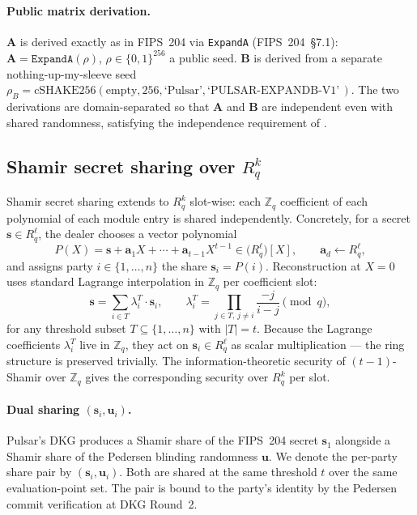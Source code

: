\documentclass[11pt,a4paper]{article}
\theoremstyle{definition}
\theoremstyle{remark}
\newcommand{\Rq}{R_q}
\newcommand{\Zq}{\mathbb{Z}_q}
\newcommand{\cSHAKE}{\mathrm{cSHAKE256}}
\begin{document}
\paragraph{Public matrix derivation.}
$\mathbf{A}$ is derived exactly as in FIPS~204 via
\texttt{ExpandA} (FIPS~204~\S7.1): \(\mathbf{A} = \texttt{ExpandA}(\rho)\),
$\rho \in \{0,1\}^{256}$ a public seed. $\mathbf{B}$ is derived from
a separate nothing-up-my-sleeve seed
$\rho_B = \cSHAKE(\text{empty}, 256, \text{`Pulsar'},
\text{`PULSAR-EXPANDB-V1'}\,)$. The two derivations are
domain-separated so that $\mathbf{A}$ and $\mathbf{B}$ are independent
even with shared randomness, satisfying the independence
requirement of .

\subsection{Shamir secret sharing over $\Rq^k$}
\label{sec:prelim-shamir}

Shamir secret sharing extends to $\Rq^k$ slot-wise: each $\Zq$
coefficient of each polynomial of each module entry is shared
independently. Concretely, for a secret $\mathbf{s} \in \Rq^\ell$,
the dealer chooses a vector polynomial
\[
P(X) = \mathbf{s} + \mathbf{a}_1 X + \cdots + \mathbf{a}_{t-1} X^{t-1}
\in \bigl(\Rq^\ell\bigr)[X], \qquad \mathbf{a}_d \gets \Rq^\ell,
\]
and assigns party $i \in \{1, \dots, n\}$ the share $\mathbf{s}_i = P(i)$.
Reconstruction at $X = 0$ uses standard Lagrange interpolation in
$\Zq$ per coefficient slot:
\[
\mathbf{s} = \sum_{i \in T} \lambda_i^T \cdot \mathbf{s}_i, \qquad
\lambda_i^T = \prod_{j \in T,\, j \ne i} \frac{-j}{i - j} \pmod q,
\]
for any threshold subset $T \subseteq \{1, \dots, n\}$ with
$|T| = t$. Because the Lagrange coefficients $\lambda_i^T$ live in
$\Zq$, they act on $\mathbf{s}_i \in \Rq^\ell$ as scalar
multiplication --- the ring structure is preserved trivially. The
information-theoretic security of $(t-1)$-Shamir over $\Zq$ gives
the corresponding security over $\Rq^k$ per slot.

\paragraph{Dual sharing $(\mathbf{s}_i, \mathbf{u}_i)$.}
Pulsar's DKG produces a Shamir share of the FIPS~204 secret
$\mathbf{s}_1$ alongside a Shamir share of the Pedersen blinding
randomness $\mathbf{u}$. We denote the per-party share pair by
$(\mathbf{s}_i, \mathbf{u}_i)$. Both are shared at the same threshold
$t$ over the same evaluation-point set. The pair is bound to the
party's identity by the Pedersen commit verification at DKG Round~2.
\end{document}
